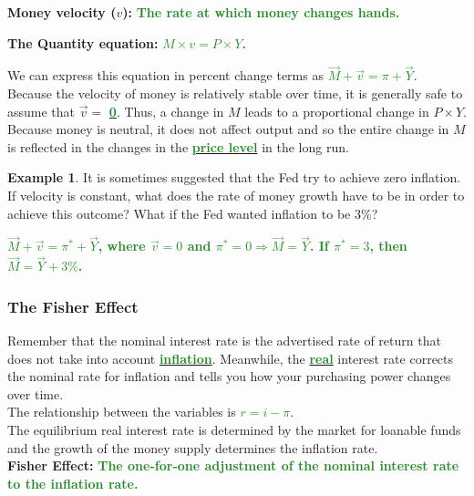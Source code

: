 \documentclass[11pt]{article}\usepackage[]{graphicx}\usepackage[]{color}
\theoremstyle{definition}
\newtheorem{exmp}{Example}[section]
\newcommand{\blank}[1]{}
\newcommand{\ddp}[1]{{\textbf{\textcolor{ForestGreen}{#1}}}}
\newcommand{\dd}[1]{{\underline{\textbf{\textcolor{ForestGreen}{#1}}}}}
\newcommand{\defn}[1]{\textbf{#1}}
\begin{document}
\defn{Money velocity ($v$):} \ddp{The rate at which money changes hands.\\}


\defn{The Quantity equation:} \ddp{$M \times v = P \times Y$.\\}


We can express this equation in percent change terms as \dd{$\vec{M} + \vec{v} = \pi + \vec{Y}$}.
\\

Because the velocity of money is relatively stable over time, it is generally safe to assume that $\vec{v} = $ \dd{0}. Thus, a change in $M$ leads to a proportional change in $P \times Y$. 
\\

Because money is neutral, it does not affect output and so the entire change in $M$ is reflected in the changes in the \dd{price level} in the long run. 
\\

\begin{exmp}
It is sometimes suggested that the Fed try to achieve zero inflation. If velocity is constant, what does the rate of money growth have to be in order to achieve this outcome? What if the Fed wanted inflation to be 3\%?
\end{exmp} 
\ddp{$\vec{M} + \vec{v} = \pi^* + \vec{Y}$, where $\vec{v} = 0$ and $\pi^* = 0 \Rightarrow \vec{M} = \vec{Y}$. If $\pi^* = 3$, then $\vec{M} = \vec{Y} + 3\%$.}
\blank{}


\subsubsection*{The Fisher Effect}

Remember that the nominal interest rate is the advertised rate of return that does not take into account \dd{inflation}. Meanwhile, the \dd{real} interest rate corrects the nominal rate for inflation and tells you how your purchasing power changes over time.
\\

The relationship between the variables is \dd{$r = i - \pi$}.
\\

The equilibrium real interest rate is determined by the market for loanable funds and the growth of the money supply determines the inflation rate. 
\\

\defn{Fisher Effect:} \ddp{The one-for-one adjustment of the nominal interest rate to the inflation rate.}
\\
\end{document}
